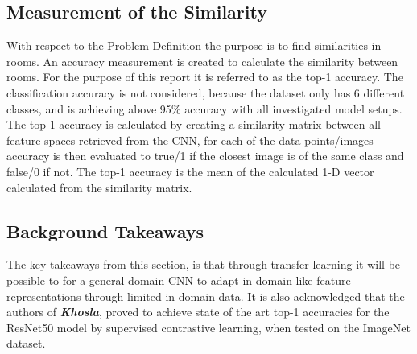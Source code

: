 \subsection{Measurement of the Similarity}\label{sec:Similarity}
With respect to the \hyperref[sec:Problem Definition]{Problem Definition} the purpose is to find similarities in rooms. An accuracy measurement is created to calculate the similarity between rooms. For the purpose of this report it is referred to as the top-1 accuracy. The classification accuracy is not considered, because the dataset only has 6 different classes, and is achieving above 95\% accuracy with all investigated model setups. The top-1 accuracy is calculated by creating a similarity matrix between all feature spaces retrieved from the CNN, for each of the data points/images accuracy is then evaluated to true/1 if the closest image is of the same class and false/0 if not. The top-1 accuracy is the mean of the calculated 1-D vector calculated from the similarity matrix.

\subsection{Background Takeaways}\label{sec:Background Takeaways}
The key takeaways from this section, is that through transfer learning it will be possible to for a general-domain CNN to adapt in-domain like feature representations through limited in-domain data. It is also acknowledged that the authors of \textbf{\textit{Khosla}}\autocite{khosla2020supervised}, proved to achieve state of the art top-1 accuracies for the ResNet50 model by supervised contrastive learning, when tested on the ImageNet dataset.
